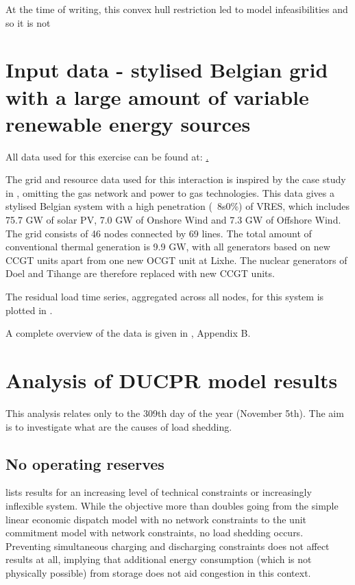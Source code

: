 \documentclass[number,times]{elsarticle}
\begin{document}
At the time of writing, this convex hull restriction led to model infeasibilities and so it is not

\section{Input data - stylised Belgian grid with a large amount of variable renewable energy sources} \label{sec:data}

All data used for this exercise can be found at: \href{https://www.dropbox.com/sh/mdvmc082gwng0tr/AABRyc3fZpxAFycmUfZmh8Csa?dl=0}.

The grid and resource data used for this interaction is inspired by the case study in \cite{Belderbos2020}, omitting the gas network and power to gas technologies. This data gives a stylised Belgian system with a high penetration (~8s0\%) of \ac{VRES}, which includes 75.7 GW of solar PV, 7.0 GW of Onshore Wind and 7.3 GW of Offshore Wind. The grid consists of 46 nodes connected by 69 lines. The total amount of conventional thermal generation is 9.9 GW, with all generators based on new \ac{CCGT} units apart from one new \ac{OCGT} unit at Lixhe. The nuclear generators of Doel and Tihange are therefore replaced with new \ac{CCGT} units.

The residual load time series, aggregated across all nodes, for this system is plotted in .

A complete overview of the data is given in \cite{Belderbos2020}, Appendix B.

\section{Analysis of \acl{DUCPR} model results} \label{sec:initial_results}

This analysis relates only to the 309th day of the year (November 5th). The aim is to investigate what are the causes of load shedding.

\subsection{No operating reserves}

 lists results for an increasing level of technical constraints or increasingly inflexible system. While the objective more than doubles going from the simple linear economic dispatch model with no network constraints to the unit commitment model with network constraints, no load shedding occurs. Preventing simultaneous charging and discharging constraints does not affect results at all, implying that additional energy consumption (which is not physically possible) from storage does not aid congestion in this context.
\end{document}
